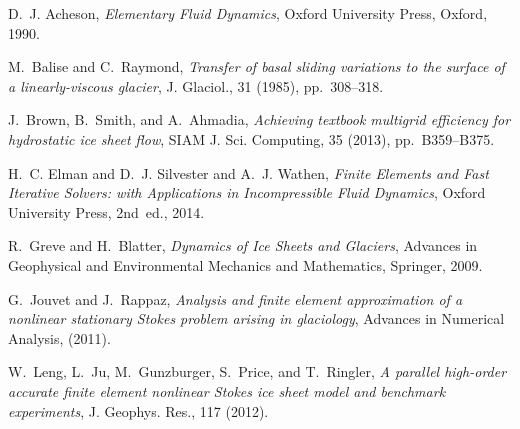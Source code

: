 \documentclass[letterpaper,final,12pt,reqno]{amsart}
\begin{document}
\footnotesize

\bigskip
%
%
\begin{thebibliography}{8}

{\sc D.~J. Acheson}, {\em Elementary {F}luid {D}ynamics}, Oxford University
  Press, Oxford, 1990.

{\sc M.~Balise and C.~Raymond}, {\em Transfer of basal sliding variations to
  the surface of a linearly-viscous glacier}, J. Glaciol., 31 (1985),
  pp.~308--318.

{\sc J.~Brown, B.~Smith, and A.~Ahmadia}, {\em Achieving textbook multigrid
  efficiency for hydrostatic ice sheet flow}, SIAM J. Sci. Computing,
  35 (2013), pp.~B359--B375.

{\sc H.~C. Elman and D.~J. Silvester and A.~J. Wathen}, {\em Finite Elements
  and Fast Iterative Solvers: with Applications in Incompressible Fluid Dynamics},
  Oxford University Press, 2nd~ed., 2014.

{\sc R.~Greve and H.~Blatter}, {\em Dynamics of {I}ce {S}heets and {G}laciers},
  Advances in Geophysical and Environmental Mechanics and Mathematics,
  Springer, 2009.

{\sc G.~Jouvet and J.~Rappaz}, {\em Analysis and finite element approximation
  of a nonlinear stationary {S}tokes problem arising in glaciology}, Advances
  in Numerical Analysis, (2011).

{\sc W.~Leng, L.~Ju, M.~Gunzburger, S.~Price, and T.~Ringler}, {\em A parallel
  high-order accurate finite element nonlinear {S}tokes ice sheet model and
  benchmark experiments}, J. Geophys. Res., 117 (2012).

\end{thebibliography}
\end{document}
